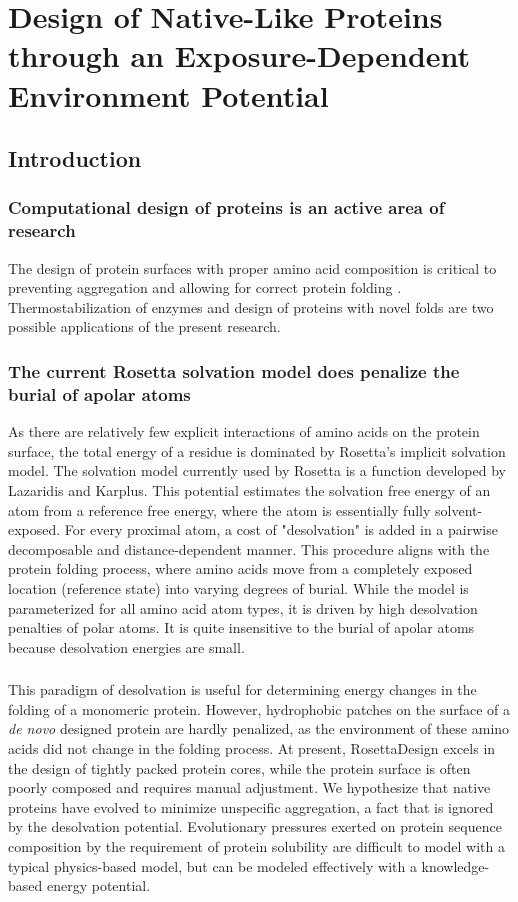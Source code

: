 \chapter{Design of Native-Like Proteins through an Exposure-Dependent Environment Potential}
\label{chap:nv_kbp}
\section{Introduction}
\subsection{Computational design of proteins is an active area of research}
The design of protein surfaces with proper amino acid composition is critical to preventing aggregation and allowing for correct protein folding \citep{Chandler:2005ds}.
Thermostabilization of enzymes and design of proteins with novel folds are two possible applications of the present research. 

\subsection{The current Rosetta solvation model does penalize the burial of apolar atoms}
As there are relatively few explicit interactions of amino acids on the protein surface, the total energy of a residue is dominated by Rosetta's implicit solvation model.
The solvation model currently used by Rosetta is a function developed by Lazaridis and Karplus\citep{Lazaridis:1999wi}.
This potential estimates the solvation free energy of an atom from a reference free energy, where the atom is essentially fully solvent-exposed.
For every proximal atom, a cost of "desolvation" is added in a pairwise decomposable and distance-dependent manner.
This procedure aligns with the protein folding process, where amino acids move from a completely exposed location (reference state) into varying degrees of burial.
While the model is parameterized for all amino acid atom types, it is driven by high desolvation penalties of polar atoms.
It is quite insensitive to the burial of apolar atoms because desolvation energies are small. 

\subsection{}
This paradigm of desolvation is useful for determining energy changes in the folding of a monomeric protein.
However, hydrophobic patches on the surface of a \textit{de novo} designed protein are hardly penalized, as the environment of these amino acids did not change in the folding process.
At present, RosettaDesign excels in the design of tightly packed protein cores, while the protein surface is often poorly composed and requires manual adjustment\citep{Dantas:2003vt}.
We hypothesize that native proteins have evolved to minimize unspecific aggregation, a fact that is ignored by the desolvation potential.
Evolutionary pressures exerted on protein sequence composition by the requirement of protein solubility are difficult to model with a typical physics-based model, but can be modeled effectively with a knowledge-based energy potential. 

